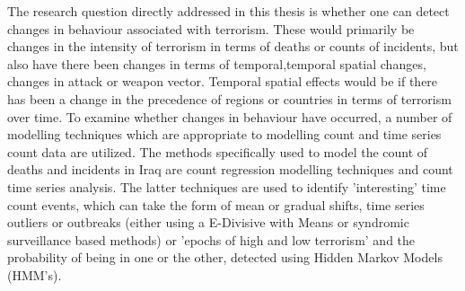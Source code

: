 The research question directly addressed in this thesis is whether one can detect changes in behaviour associated with terrorism. These would primarily be changes in the intensity of terrorism in terms of deaths or counts of incidents, but also have there been changes in terms of temporal,temporal spatial changes, changes in attack or weapon vector. Temporal spatial effects would be if there has been a change in the precedence of regions or countries in terms of terrorism over time. To examine whether changes in behaviour have occurred, a number of modelling techniques which are appropriate to modelling count and time series count data are utilized. The methods specifically used to model the count of deaths and incidents in Iraq are count regression modelling techniques and count time series analysis. The latter techniques are used to identify 'interesting' time count events, which can take the form of mean or gradual shifts, time series outliers or outbreaks (either using a E-Divisive with Means or syndromic surveillance based methods) or 'epochs of high and low terrorism' and the probability of being in one or the other, detected using Hidden Markov Models (HMM's).      

